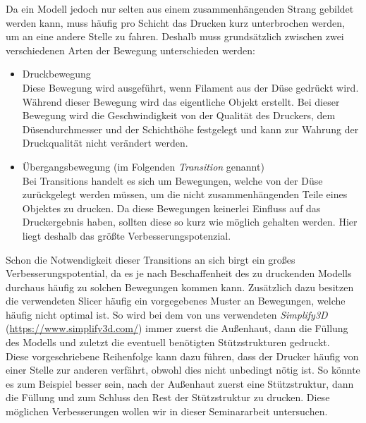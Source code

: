\documentclass[12pt, a4paper]{article}
\begin{document}
Da ein Modell jedoch nur selten aus einem zusammenhängenden Strang gebildet werden kann, muss häufig pro Schicht das Drucken kurz unterbrochen werden, um an eine andere Stelle zu fahren. Deshalb muss grundsätzlich zwischen zwei verschiedenen Arten der Bewegung unterschieden werden:
\begin{itemize}
\item Druckbewegung\\
Diese Bewegung wird ausgeführt, wenn Filament aus der Düse gedrückt wird. Während dieser Bewegung wird das eigentliche Objekt erstellt. Bei dieser Bewegung wird die Geschwindigkeit von der Qualität des Druckers, dem Düsendurchmesser und der Schichthöhe festgelegt und kann zur Wahrung der Druckqualität nicht verändert werden.
\item Übergangsbewegung (im Folgenden \textit{Transition} genannt)\\
Bei Transitions handelt es sich um Bewegungen, welche von der Düse zurückgelegt werden müssen, um die nicht zusammenhängenden Teile eines Objektes zu drucken. Da diese Bewegungen keinerlei Einfluss auf das Druckergebnis haben, sollten diese so kurz wie möglich gehalten werden. Hier liegt deshalb das größte Verbesserungspotenzial. 
\end{itemize}
Schon die Notwendigkeit dieser Transitions an sich birgt ein großes Verbesserungspotential, da es je nach Beschaffenheit des zu druckenden Modells durchaus häufig zu solchen Bewegungen kommen kann. Zusätzlich dazu besitzen die verwendeten Slicer häufig ein vorgegebenes Muster an Bewegungen, welche häufig nicht optimal ist. So wird bei dem von uns verwendeten \textit{Simplify3D} (\url{https://www.simplify3d.com/}) immer zuerst die Außenhaut, dann die Füllung des Modells und zuletzt die eventuell benötigten Stützstrukturen gedruckt.\\
Diese vorgeschriebene Reihenfolge kann dazu führen, dass der Drucker häufig von einer Stelle zur anderen verfährt, obwohl dies nicht unbedingt nötig ist. So könnte es zum Beispiel besser sein, nach der Außenhaut zuerst eine Stützstruktur, dann die Füllung und zum Schluss den Rest der Stützstruktur zu drucken. Diese möglichen Verbesserungen wollen wir in dieser Seminararbeit untersuchen.
\end{document}
